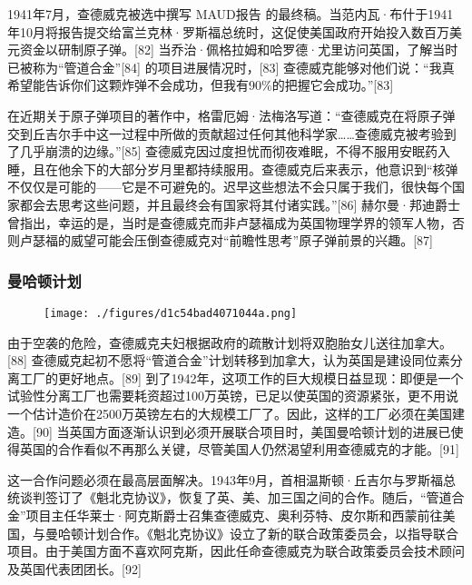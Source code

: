 1941年7月，查德威克被选中撰写 MAUD报告 的最终稿。当范内瓦·布什于1941年10月将报告提交给富兰克林·罗斯福总统时，这促使美国政府开始投入数百万美元资金以研制原子弹。[82] 当乔治·佩格拉姆和哈罗德·尤里访问英国，了解当时已被称为“管道合金”[84] 的项目进展情况时，[83] 查德威克能够对他们说：“我真希望能告诉你们这颗炸弹不会成功，但我有90\%的把握它会成功。”[83]

在近期关于原子弹项目的著作中，格雷厄姆·法梅洛写道：“查德威克在将原子弹交到丘吉尔手中这一过程中所做的贡献超过任何其他科学家……查德威克被考验到了几乎崩溃的边缘。”[85] 查德威克因过度担忧而彻夜难眠，不得不服用安眠药入睡，且在他余下的大部分岁月里都持续服用。查德威克后来表示，他意识到“核弹不仅仅是可能的——它是不可避免的。迟早这些想法不会只属于我们，很快每个国家都会去思考这些问题，并且最终会有国家将其付诸实践。”[86] 赫尔曼·邦迪爵士曾指出，幸运的是，当时是查德威克而非卢瑟福成为英国物理学界的领军人物，否则卢瑟福的威望可能会压倒查德威克对“前瞻性思考”原子弹前景的兴趣。[87]
\subsubsection{曼哈顿计划}
\begin{figure}[ht]
\centering
\texttt{[image: ./figures/d1c54bad4071044a.png]}
\caption{} \label{fig_ZMcdw_6}
\end{figure}
由于空袭的危险，查德威克夫妇根据政府的疏散计划将双胞胎女儿送往加拿大。[88] 查德威克起初不愿将“管道合金”计划转移到加拿大，认为英国是建设同位素分离工厂的更好地点。[89] 到了1942年，这项工作的巨大规模日益显现：即便是一个试验性分离工厂也需要耗资超过100万英镑，已足以使英国的资源紧张，更不用说一个估计造价在2500万英镑左右的大规模工厂了。因此，这样的工厂必须在美国建造。[90] 当英国方面逐渐认识到必须开展联合项目时，美国曼哈顿计划的进展已使得英国的合作看似不再那么关键，尽管美国人仍然渴望利用查德威克的才能。[91]

这一合作问题必须在最高层面解决。1943年9月，首相温斯顿·丘吉尔与罗斯福总统谈判签订了《魁北克协议》，恢复了英、美、加三国之间的合作。随后，“管道合金”项目主任华莱士·阿克斯爵士召集查德威克、奥利芬特、皮尔斯和西蒙前往美国，与曼哈顿计划合作。《魁北克协议》设立了新的联合政策委员会，以指导联合项目。由于美国方面不喜欢阿克斯，因此任命查德威克为联合政策委员会技术顾问及英国代表团团长。[92]

